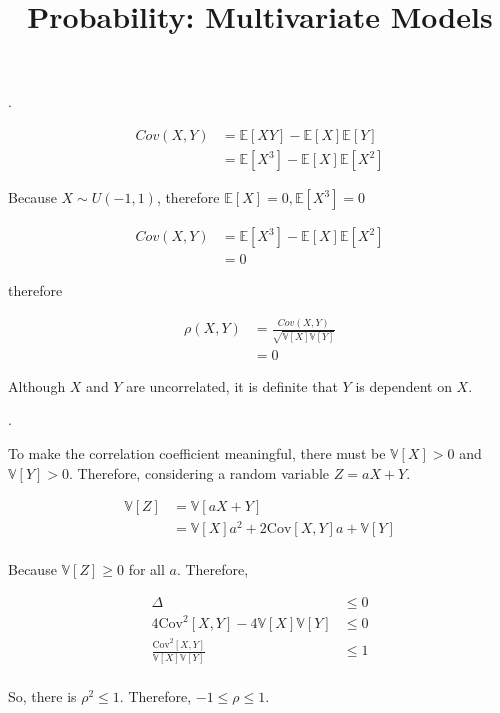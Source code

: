\documentclass[UTF8]{article}
\title{Probability: Multivariate Models}
\date{}
\begin{document}
\maketitle

.

\begin{align*}
    Cov(X, Y) &= \mathbb{E}[XY] - \mathbb{E}[X]\mathbb{E}[Y]\\
    &=\mathbb{E}[X^3] - \mathbb{E}[X]\mathbb{E}[X^2]
\end{align*}

Because $X\sim U(-1, 1)$, therefore $\mathbb{E}[X] = 0, \mathbb{E}[X^3] = 0$

\begin{align*}
    Cov(X, Y) &=\mathbb{E}[X^3] - \mathbb{E}[X]\mathbb{E}[X^2]\\
    &=0
\end{align*}

therefore

\begin{align*}
    \rho(X, Y) &=\frac{Cov(X, Y)}{\sqrt{\mathbb{V}[X]\mathbb{V}[Y]}}\\
    &=0
\end{align*}

Although $X$ and $Y$ are uncorrelated, it is definite that $Y$ is dependent on $X$.

.

To make the correlation coefficient meaningful, there must be $\mathbb{V}[X]>0$ and $\mathbb{V}[Y]>0$. Therefore, considering a random variable $Z = aX + Y$.

\begin{align*}
	\mathbb{V}[Z] &= \mathbb{V}[aX+Y]\\
	&=\mathbb{V}[X]a^2+2\text{Cov}[X, Y]a+\mathbb{V}[Y]\\
\end{align*}

Because $\mathbb{V}[Z]\ge 0$ for all $a$. Therefore, 

\begin{align*}
	\Delta &\le 0\\
	4\text{Cov}^2[X, Y] - 4\mathbb{V}[X]\mathbb{V}[Y]&\le 0\\
	\frac{\text{Cov}^2[X, Y]}{\mathbb{V}[X]\mathbb{V}[Y]}&\le 1\\
\end{align*}

So, there is $\rho^2\le 1$. Therefore, $-1\le\rho\le 1$.
\end{document}
